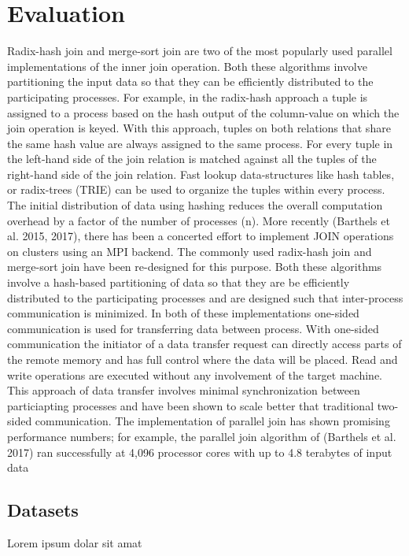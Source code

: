 

\section{Evaluation}
\label{sec:eval}
%
Radix-hash join and merge-sort join are two of the most popularly used parallel implementations of the inner join
operation. Both these algorithms involve partitioning the input data so that they can be efficiently distributed
to the participating processes. For example, in the radix-hash approach a tuple is assigned to a process based
on the hash output of the column-value on which the join operation is keyed. With this approach, tuples on
both relations that share the same hash value are always assigned to the same process. For every tuple in the
left-hand side of the join relation is matched against all the tuples of the right-hand side of the join relation. Fast
lookup data-structures like hash tables, or radix-trees (TRIE) can be used to organize the tuples within every
process. The initial distribution of data using hashing reduces the overall computation overhead by a factor of
the number of processes (n).
More recently (Barthels et al. 2015, 2017), there has been a concerted effort to implement JOIN operations on
clusters using an MPI backend. The commonly used radix-hash join and merge-sort join have been re-designed
for this purpose. Both these algorithms involve a hash-based partitioning of data so that they are be efficiently
distributed to the participating processes and are designed such that inter-process communication is minimized.
In both of these implementations one-sided communication is used for transferring data between process. With
one-sided communication the initiator of a data transfer request can directly access parts of the remote memory
and has full control where the data will be placed. Read and write operations are executed without any
involvement of the target machine. This approach of data transfer involves minimal synchronization between
particiapting processes and have been shown to scale better that traditional two-sided communication. The
implementation of parallel join has shown promising performance numbers; for example, the parallel join algorithm
of (Barthels et al. 2017) ran successfully at 4,096 processor cores with up to 4.8 terabytes of input data


\subsection{Datasets}
\label{sec:datasets}
Lorem ipsum dolar sit amat


